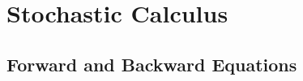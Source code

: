 \documentclass[12pt]{article}
\theoremstyle{plain}
\theoremstyle{definition}
\theoremstyle{remark}
\begin{document}




\clearpage
\section{Stochastic Calculus}

\subsection{Forward and Backward Equations}
\end{document}
